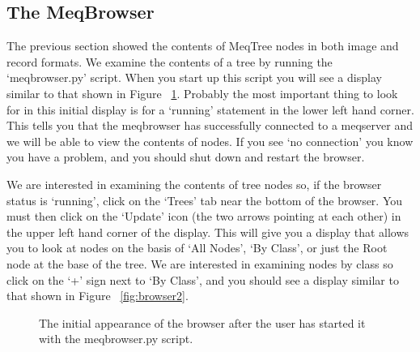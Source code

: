 \documentclass[10pt]{article}
\begin{document}
\subsection {The MeqBrowser}

The previous section showed the contents of MeqTree nodes in both 
image and record formats. We examine the contents of a tree
by running the `meqbrowser.py' script. When you start up this script
you will see a display similar to that shown in 
Figure  ~\ref{fig:browser1}. Probably the most important thing to
look for in this initial display is for a `running' statement in the
lower left hand corner. This tells you that the meqbrowser has
successfully connected to a meqserver and we will be able to view
the contents of nodes. If you see `no connection' you know you have a
problem, and you should shut down and restart the browser.

We are interested in examining the contents of tree nodes so, if the
browser status is `running', click on the `Trees' tab near the
bottom of the browser. You must then click on the `Update' icon
(the two arrows pointing at each other) in the upper left hand
corner of the display. This will give you a display that allows you
to look at nodes on the basis of `All Nodes', `By Class', or just 
the Root node at the base of the tree. 
We are interested in examining nodes by class so click
on the `+' sign next to `By Class', and you should see a display
similar to that shown in Figure  ~\ref{fig:browser2}. 

\begin{figure}
{\par\centering
{}
\par}
\caption {The initial appearance of the browser after the user has 
started it with the meqbrowser.py script.}
\label{fig:browser1}
\end{figure}
\end{document}
